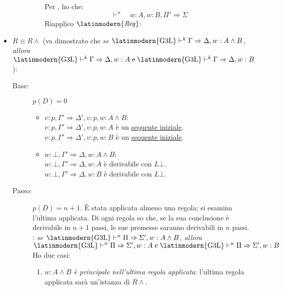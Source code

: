 \documentclass[a4paper,12pt]{article}
\newcommand{\latinmath}[1]{\text{\latinmodern{#1}}} %
\newcommand{\To}{\Rightarrow} %
\begin{document}
\begin{dimo}
\begin{itemize}
\begin{description}
\begin{enumerate}
\begin{mathpar}
				\end{mathpar}
				Per \latinmath{IH}, ho che:
				$$\vdash^{n} \quad w:A, w:B, \Pi' \To \Sigma$$
				Riapplico $\latinmath{\emph{Reg}}$:
				\begin{mathpar}
					\inferrule*[Right=$\latinmath{\emph{Reg}}$]{\vdash^n \quad w:A, w:B, \Pi' \To \Sigma}{\vdash^{n+1} \quad w:A, w:B, \Gamma' \To \Delta}
				\end{mathpar}
			\end{enumerate}
		\end{description}
		\item $R \equiv R\land$ (va dimostrato che \emph{se $\latinmath{G3L} \vdash^{k} \Gamma \To \Delta, w:A \land B$, allora $\latinmath{G3L} \vdash^{k} \Gamma \To \Delta, w:A \; \text{e} \; \latinmath{G3L} \vdash^{k} \Gamma \To \Delta, w:B$}):
		\begin{description}
			\item[Base:] $p(D)=0$ 
			\begin{itemize}
			\item $v:p, \Gamma' \To \Delta', v:p, w:A \land B$: \\
			$v:p, \Gamma' \To \Delta', v:p, w:A$ \qquad \qquad è un \hyperlink{seqetin}{sequente iniziale}. \\
			$v:p, \Gamma' \To \Delta', v:p, w:B$ \qquad \qquad è un \hyperlink{seqetin}{sequente iniziale}.
			\item $w:\bot, \Gamma' \To \Delta, w:A \land B$: \\
			$w:\bot, \Gamma' \To \Delta, w:A$ \qquad \qquad \qquad è derivabile con \hyperlink{Lbotet}{$L\bot$}. \\
			$w:\bot, \Gamma' \To \Delta, w:B$ \qquad \qquad \qquad è derivabile con \hyperlink{Lbotet}{$L\bot$}.
			\end{itemize}
			\item[Passo:] $p(D)=n+1$. \`{E} stata applicata almeno una regola; si esamina l'ultima applicata. Di ogni regola so che, se la sua conclusione è derivabile in $n+1$ passi, le sue premesse saranno derivabili in $n$ passi. \\
			\latinmath{IH}: \emph{se $\latinmath{G3L} \vdash^{n} \Pi \To \Sigma', w:A \land B$, allora $\latinmath{G3L} \vdash^{n} \Pi \To \Sigma', w:A \; \text{e} \; \latinmath{G3L} \vdash^{n} \Pi \To \Sigma', w:B$} \\
			Ho due casi:
			\begin{enumerate}
				\item \emph{$w:A \land B$ è principale nell'ultima regola applicata}: l'ultima regola applicata sarà un'istanza di $R\land$.

\end{enumerate}
\end{description}
\end{itemize}
\end{dimo}
\end{document}
